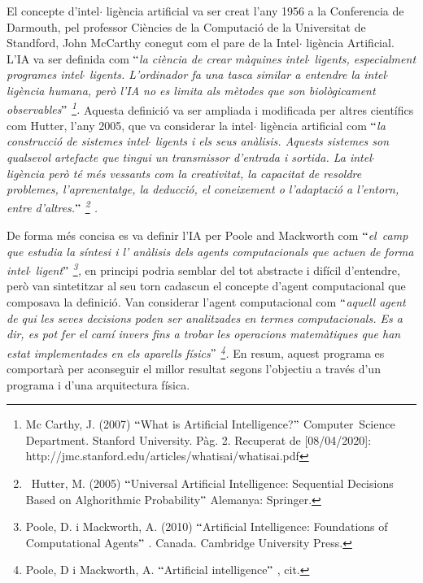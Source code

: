 \documentclass[12pt]{article}
\begin{document}
\vspace{\baselineskip}
\begin{justify}
El concepte d’intel$ \cdot $ ligència artificial va ser creat l’any 1956 a la Conferencia de Darmouth, pel professor Ciències de la Computació de la Universitat de Standford, John McCarthy conegut com el pare de la Intel$ \cdot $ ligència Artificial. L’IA va ser definida com $``$\textit{la ciència de crear màquines intel$ \cdot $ ligents, especialment programes intel$ \cdot $ ligents. L’ordinador fa una tasca similar a entendre la intel$ \cdot $ ligència humana, però l’IA no es limita als mètodes que son biològicament observables$"$ \footnote{ Mc Carthy, J. (2007) $``$What is Artificial Intelligence?$"$  Computer\ Science Department. Stanford University.  Pàg. 2. Recuperat de [08/04/2020]: http://jmc.stanford.edu/articles/whatisai/whatisai.pdf }. }Aquesta definició va ser ampliada i modificada per altres científics com Hutter, l’any 2005, que va considerar la intel$ \cdot $ ligència artificial com $``$\textit{la construcció de sistemes intel$ \cdot $ ligents i els seus anàlisis. Aquests sistemes son qualsevol artefacte que tingui un transmissor d’entrada i sortida. La intel$ \cdot $ ligència però té més vessants com la creativitat, la capacitat de resoldre problemes, l’aprenentatge, la deducció, el coneixement o l’adaptació a l’entorn, entre d’altres.$"$ \footnote{\  Hutter, M. (2005) $``$Universal Artificial Intelligence: Sequential Decisions Based on Alghorithmic Probability$"$  Alemanya: Springer. } . }
\end{justify}\par

\begin{justify}
De forma més concisa es va definir l’IA per Poole and Mackworth com $``$\textit{el\ camp  que estudia la síntesi i l’ anàlisis dels agents computacionals que actuen de forma intel$ \cdot $ ligent$"$ \footnote{ Poole, D. i Mackworth, A. (2010) $``$Artificial Intelligence: Foundations of Computational Agents$"$ . Canada. Cambridge University Press.  }, }en principi podria semblar del tot abstracte i difícil d’entendre, però van sintetitzar al seu torn cadascun el concepte d’agent computacional que composava la definició\textit{. }Van considerar l’agent computacional com \textit{$``$aquell agent de qui les seves decisions poden ser analitzades en termes computacionals. Es a dir, es pot fer el camí invers fins a trobar les operacions matemàtiques que han estat implementades en els aparells físics$"$ \footnote{ Poole, D i Mackworth, A. $``$Artificial intelligence$"$ , cit. }. } En resum, aquest programa es comportarà per aconseguir el millor resultat segons l’objectiu a través d’un programa i d’una arquitectura física. 
\end{justify}\par
\end{document}
